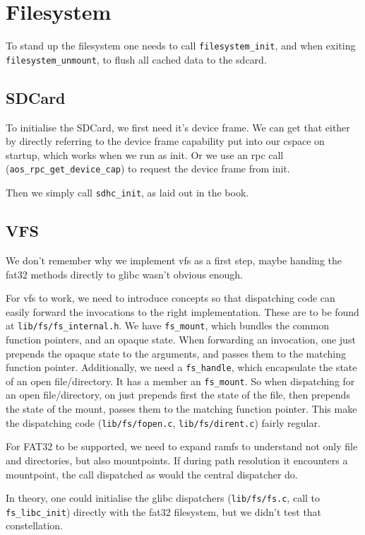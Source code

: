 \chapter{Filesystem}

To stand up the filesystem one needs to call \verb|filesystem_init|, and when
exiting \verb|filesystem_unmount|, to flush all cached data to the sdcard.

\section{SDCard}

To initialise the SDCard, we first need it's device frame.
We can get that either by directly referring to the device frame capability put
into our cspace on startup, which works when we run as init.
Or we use an rpc call (\verb|aos_rpc_get_device_cap|) to request the device
frame from init.

Then we simply call \verb|sdhc_init|, as laid out in the book.

\section{VFS}

We don't remember why we implement vfs as a first step, maybe handing the fat32
methods directly to glibc wasn't obvious enough.

For vfs to work, we need to introduce concepts so that dispatching code can
easily forward the invocations to the right implementation.
These are to be found at \verb|lib/fs/fs_internal.h|.
We have \verb|fs_mount|, which bundles the common function pointers, and an
opaque state.
When forwarding an invocation, one just prepends the opaque state to the
arguments, and passes them to the matching function pointer.
Additionally, we need a \verb|fs_handle|, which encapsulate the state of an open
file/directory.
It has a member an \verb|fs_mount|.
So when dispatching for an open file/directory, on just prepends first the state
of the file, then prepends the state of the mount, passes them to the matching
function pointer.
This make the dispatching code (\verb|lib/fs/fopen.c|,
\verb|lib/fs/dirent.c|) fairly regular.

For FAT32 to be supported, we need to expand ramfs to understand not only file
and directories, but also mountpoints. If during path resolution it encounters a
mountpoint, the call dispatched as would the central dispatcher do.

In theory, one could initialise the glibc dispatchers (\verb|lib/fs/fs.c|, call
to \verb|fs_libc_init|) directly with the fat32 filesystem, but we didn't test
that constellation.

